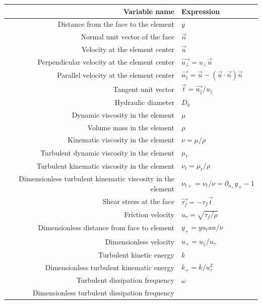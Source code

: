 \begin{center}
\begin{tabular}{|r|l|}
	\hline Variable name & Expression \\ \hline \hline
	Distance from the face to the element & $y$ \\ \hline
	Normal unit vector of the face & $\overrightarrow{n}$ \\ \hline
	Velocity at the element center & $\overrightarrow{u}$\\ \hline
	Perpendicular velocity at the element center 
		& $\overrightarrow{u_{\perp}}=u_{\perp}\overrightarrow{n}$\\ \hline
	Parallel velocity at the element center 
		& $\overrightarrow{u_{\parallel}}=\overrightarrow{u} - (\overrightarrow{u}\cdot\overrightarrow{n})\overrightarrow{n}$\\ \hline
	Tangent unit vector 
		& $\overrightarrow{t} = \overrightarrow{u_{\parallel}}/u_{\parallel}$ \\ \hline
	Hydraulic diameter
		& $D_h$ \\ \hline
	Dynamic viscosity in the element
		& $\mu $ \\ \hline
	Volume mass in the element
		& $\rho$ \\ \hline
	Kinematic viscosity in the element 
		& $\nu = \mu/\rho$ \\ \hline
	Turbulent dynamic viscosity in the element
		& $\mu_{t} $ \\ \hline
	Turbulent kinematic viscosity in the element 
		& $\nu_t = \mu_t/\rho$ \\ \hline
	Dimensionless turbulent kinematic viscosity in the element 
		& $\nu_{t+} = \nu_t/\nu = \partial_{u_+}y_+ - 1$ \\ \hline	
	Shear stress at the face 
		& $\overrightarrow{\tau_f} = -\tau_f \overrightarrow{t}$ \\ \hline
	Friction velocity 
		& $u_\tau = \sqrt{\tau_f/\rho}$ \\ \hline
	Dimensionless distance from face to element
		& $y_+ = y u_tau / \nu$ \\ \hline
	Dimensionless velocity
		& $u_+ = u_{\parallel}/u_\tau$ \\ \hline
	Turbulent kinetic energy 
		& $k$ \\ \hline
	Dimensionless turbulent kinematic energy 
		& $k_+ = k/u_\tau^2$ \\ \hline
	Turbulent dissipation frequency
		& $\omega$ \\ \hline
	Dimensionless turbulent dissipation frequency

\end{tabular}
\end{center}

